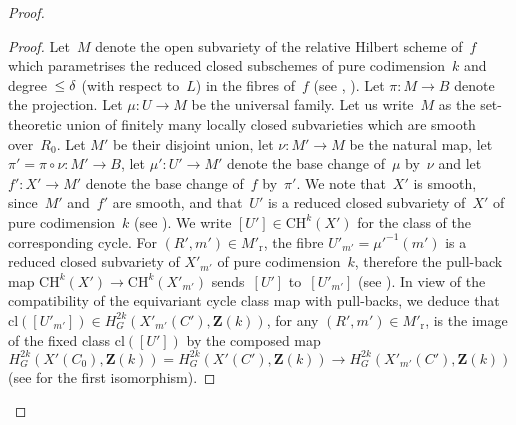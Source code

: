 \documentclass[JEP,XML,SOM,Unicode]{cedram}
\theoremstyle{plain}
\theoremstyle{definition}
\numberwithin{equation}{section}
\newcommand{\cl}{{\mathrm{cl}}}
\newcommand{\rs}{{\mathrm{r}}}
\newcommand{\Z}{{\mathbf Z}}
\newcommand{\CH}{\mathrm{CH}}
\begin{document}
\begin{proof}
\begin{proof}
Let~$M$ denote the open subvariety of the
relative Hilbert scheme of~$f$ which parametrises the
reduced closed subschemes of pure codimension~$k$
and degree~$\leq\nobreak \delta$ (with respect to~$L$) in the fibres of~$f$
(see \cite[Th.\,3.2, Lem.\,2.4]{tdte4},
\cite[Th.\,12.2.1]{ega43}).
Let $\pi:M\to B$ denote the projection. Let $\mu:U\to M$ be the universal family.
Let us write~$M$ as the set-theoretic union of finitely many locally closed subvarieties which are
smooth over~$R_0$. Let $M'$ be their disjoint union, let $\nu:M'\to M$ be the natural map,
let $\pi'=\pi\circ\nu:M'\to B$, let $\mu':U'\to M'$ denote the base change of~$\mu$ by~$\nu$
and let $f':X' \to M'$ denote the base change of~$f$ by~$\pi'$.
We note that~$X'$ is smooth, since~$M'$ and~$f'$ are smooth,
and that~$U'$ is a reduced closed subvariety of~$X'$ of pure codimension~$k$
(see \cite[Cor.\,3.3.5]{ega42}).
We write $[U'] \in \CH^k(X')$ for the class of the corresponding cycle.
For $(R',m') \in M'_\rs$,
the fibre $U'_{m'} = \mu'^{-1}(m')$
is a reduced closed subvariety of $X'_{m'}$ of pure codimension~$k$,
therefore
the pull-back map $\CH^k(X')\to \CH^k(X'_{m'})$
sends~$[U']$ to~$[U'_{m'}]$
(see \cite[Prop.\,8.2]{fulton}).
In view of the compatibility of the equivariant cycle class map with pull-backs, we deduce that
$\cl([U'_{m'}]) \in H^{2k}_G(X'_{m'}(C'),\Z(k))$, for any $(R',m') \in M'_\rs$, is the image of
the fixed class $\cl([U'])$ by the composed map
\begin{equation}
\label{eq:restriction to fibre eq coh}
H^{2k}_G(X'(C_0),\Z(k)) = H^{2k}_G(X'(C'),\Z(k)) \to H^{2k}_G(X'_{m'}(C'),\Z(k))
\end{equation}
(see \cite[Ch.\,II, Th.\,6.1]{delfshomology} for the first isomorphism).


\end{proof}
\end{proof}
\end{document}
